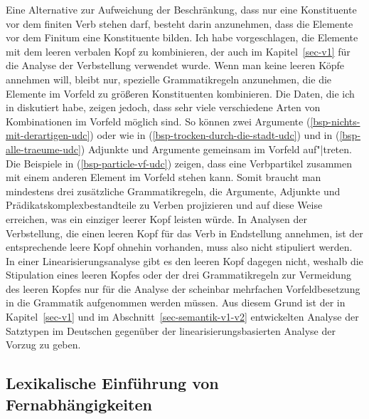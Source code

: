\noindent
Eine Alternative zur Aufweichung der Beschränkung, dass nur eine Konstituente vor dem finiten
Verb stehen darf, besteht darin anzunehmen, dass die Elemente vor dem Finitum eine Konstituente
bilden. Ich habe vorgeschlagen, die Elemente mit dem leeren verbalen Kopf zu kombinieren, der
auch im Kapitel~\ref{sec-v1} für die Analyse der Verbstellung verwendet wurde. Wenn man keine
leeren Köpfe annehmen will, bleibt nur, spezielle Grammatikregeln anzunehmen, die die Elemente
im Vorfeld zu größeren Konstituenten kombinieren. Die Daten, die ich in 
diskutiert habe, zeigen jedoch, dass sehr viele verschiedene Arten von Kombinationen
im Vorfeld möglich sind. So können zwei Argumente (\ref{bsp-nichts-mit-derartigen-udc}) oder wie in
(\ref{bsp-trocken-durch-die-stadt-udc}) und in (\ref{bsp-alle-traeume-udc}) Adjunkte und Argumente
gemeinsam im Vorfeld auf"|treten. Die Beispiele in (\ref{bsp-particle-vf-udc}) zeigen, dass eine
Verbpartikel zusammen mit einem anderen Element im Vorfeld stehen kann. Somit braucht man mindestens
drei zusätzliche Grammatikregeln, die Argumente, Adjunkte und Prädikatskomplexbestandteile zu Verben projizieren und auf diese
Weise erreichen, was ein einziger leerer Kopf leisten würde. In Analysen der Verbstellung,
die einen leeren Kopf für das Verb in Endstellung annehmen, ist der entsprechende leere Kopf
ohnehin vorhanden, muss also nicht stipuliert werden. In einer Linearisierungsanalyse gibt es
den leeren Kopf dagegen nicht, weshalb die Stipulation eines leeren Kopfes oder der drei Grammatikregeln
zur Vermeidung des leeren Kopfes nur für die Analyse der scheinbar mehrfachen Vorfeldbesetzung
in die Grammatik aufgenommen werden müssen. Aus diesem Grund ist der in Kapitel~\ref{sec-v1}
und im Abschnitt~\ref{sec-semantik-v1-v2} entwickelten Analyse der Satztypen im Deutschen
gegenüber der linearisierungsbasierten Analyse der Vorzug zu geben.%


\subsection{Lexikalische Einführung von Fernabhängigkeiten}
\label{sec-lex-intro-udc}

